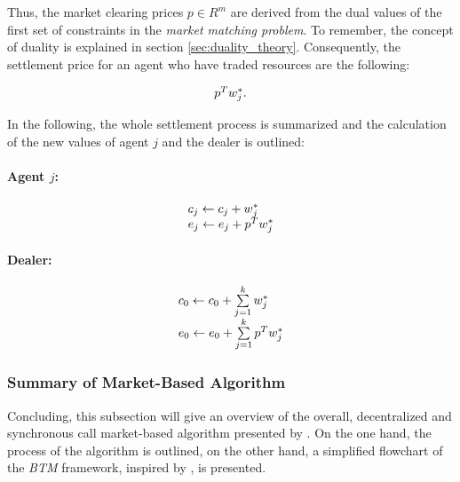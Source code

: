 Thus, the market clearing prices $p \in R^{m}$ are derived from the dual values of the first set of constraints 
in the \textit{market matching problem}. To remember, the concept of duality is explained in section \ref{sec:duality_theory}.
Consequently, the settlement price for an agent who have traded resources are the following:

\begin{equation*}
    \begin{array}{ll@{}ll}
        p^{T} w_{j}^{*}.
    \end{array}
\end{equation*}

In the following, the whole settlement process is summarized and the calculation of the new values of agent $j$ and the dealer 
is outlined:

\paragraph*{Agent $j$:}
\begin{equation*}
    \begin{array}{ll@{}ll}
        c_{j} \leftarrow c_{j} + w_{j}^{*} \\
        e_{j} \leftarrow e_{j} + p^{T} w_{j}^{*} \\
    \end{array}
\end{equation*}

\paragraph*{Dealer:}
\begin{equation*}
    \begin{array}{ll@{}ll}
        c_{0} \leftarrow c_{0} + \sum\limits_{j=1}^{k} w_{j}^{*} \\
        e_{0} \leftarrow e_{0} + \sum\limits_{j=1}^{k} p^{T} w_{j}^{*} \\
    \end{array}
\end{equation*}


\subsubsection{Summary of Market-Based Algorithm}
\label{sec:summary_of_btm}
Concluding, this subsection will give an overview of the overall, decentralized and synchronous
call market-based algorithm presented by . On the one hand, the process of the 
algorithm is outlined, on the other hand, a simplified flowchart of the \textit{BTM} framework,
inspired by , is presented. 


